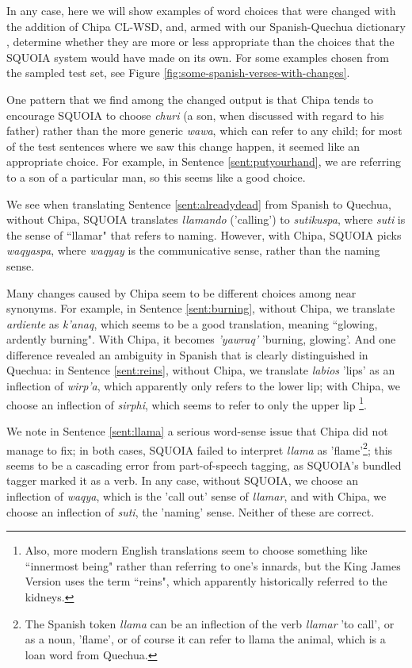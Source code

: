 In any case, here we will show examples of word choices that were changed with
the addition of Chipa CL-WSD, and, armed with our Spanish-Quechua dictionary
\cite{academiamayor}, determine whether they are more or less appropriate than
the choices that the SQUOIA system would have made on its own. For some
examples chosen from the sampled test set, see Figure
\ref{fig:some-spanish-verses-with-changes}.


One pattern that we find among the changed output is that Chipa tends to
encourage SQUOIA to choose \emph{churi} (a son, when discussed with regard to
his father) rather than the more generic \emph{wawa}, which can refer to any
child; for most of the test sentences where we saw this change happen, it
seemed like an appropriate choice. For example, in Sentence
\ref{sent:putyourhand}, we are referring to a son of a particular man, so this
seems like a good choice.

We see when translating Sentence \ref{sent:alreadydead}  from Spanish to
Quechua, without Chipa, SQUOIA translates \emph{llamando} ('calling') to
\emph{sutikuspa}, where \emph{suti} is the sense of ``llamar" that refers to
naming. However, with Chipa, SQUOIA picks \emph{waqyaspa}, where \emph{waqyay}
is the communicative sense, rather than the naming sense.

Many changes caused by Chipa seem to be different choices among near synonyms.
For example, in Sentence \ref{sent:burning}, without Chipa, we translate
\emph{ardiente} as \emph{k'anaq}, which seems to be a good translation, meaning
``glowing, ardently burning". With Chipa, it becomes \emph{'yawraq'} 'burning,
glowing'. And one difference revealed an ambiguity in Spanish that is clearly
distinguished in Quechua: in Sentence \ref{sent:reins}, without Chipa, we
translate \emph{labios} 'lips' as an inflection of \emph{wirp'a}, which
apparently only refers to the lower lip; with Chipa, we choose an inflection of
\emph{sirphi}, which seems to refer to only the upper lip
\footnote{Also, more modern English translations seem to choose something like
``innermost being" rather than referring to one's innards, but the King James
Version uses the term ``reins", which apparently historically referred to the
kidneys.}.

We note in Sentence \ref{sent:llama} a serious word-sense issue that Chipa did
not manage to fix; in both cases, SQUOIA failed to interpret \emph{llama} as
'flame'\footnote{The Spanish token \emph{llama} can be an inflection of the
verb \emph{llamar} 'to call', or as a noun, 'flame', or of course it can refer
to llama the animal, which is a loan word from Quechua.}; this seems to be a
cascading error from part-of-speech tagging, as SQUOIA's bundled tagger marked
it as a verb. In any case, without SQUOIA, we choose an inflection of
\emph{waqya}, which is the 'call out' sense of \emph{llamar}, and with Chipa,
we choose an inflection of \emph{suti}, the 'naming' sense. Neither of these
are correct.


